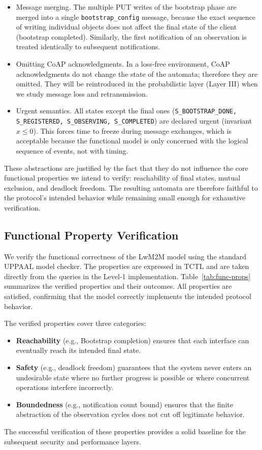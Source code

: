 \documentclass[a4paper,fleqn]{cas-sc}
\begin{document}
\begin{itemize}
    \item Message merging. The multiple PUT writes of the bootstrap phase are merged into a single \texttt{bootstrap\_config} message, because the exact sequence of writing individual objects does not affect the final state of the client (bootstrap completed). Similarly, the first notification of an observation is treated identically to subsequent notifications.
    \item Omitting CoAP acknowledgments. In a loss‑free environment, CoAP acknowledgments do not change the state of the automata; therefore they are omitted. They will be reintroduced in the probabilistic layer (Layer III) when we study message loss and retransmission.
    \item Urgent semantics. All states except the final ones (\texttt{S\_BOOTSTRAP\_DONE, S\_REGISTERED, S\_OBSERVING, S\_COMPLETED}) are declared urgent (invariant $x \leq 0$). This forces time to freeze during message exchanges, which is acceptable because the functional model is only concerned with the logical sequence of events, not with timing.
\end{itemize}

These abstractions are justified by the fact that they do not influence the core functional properties we intend to verify: reachability of final states, mutual exclusion, and deadlock freedom. The resulting automata are therefore faithful to the protocol’s intended behavior while remaining small enough for exhaustive verification.

\subsection{Functional Property Verification}
We verify the functional correctness of the LwM2M model using the standard UPPAAL model checker. The properties are expressed in TCTL and are taken directly from the queries in the Level‑1 implementation. Table~\ref{tab:func-props} summarizes the verified properties and their outcomes. All properties are satisfied, confirming that the model correctly implements the intended protocol behavior.

The verified properties cover three categories:
\begin{itemize}
\item \textbf{Reachability} (e.g., Bootstrap completion) ensures that each interface can eventually reach its intended final state.
\item \textbf{Safety} (e.g., deadlock freedom) guarantees that the system never enters an undesirable state where no further progress is possible or where concurrent operations interfere incorrectly.
\item \textbf{Boundedness} (e.g., notification count bound) ensures that the finite abstraction of the observation cycles does not cut off legitimate behavior.
\end{itemize}
The successful verification of these properties provides a solid baseline for the subsequent security and performance layers.
\end{document}
